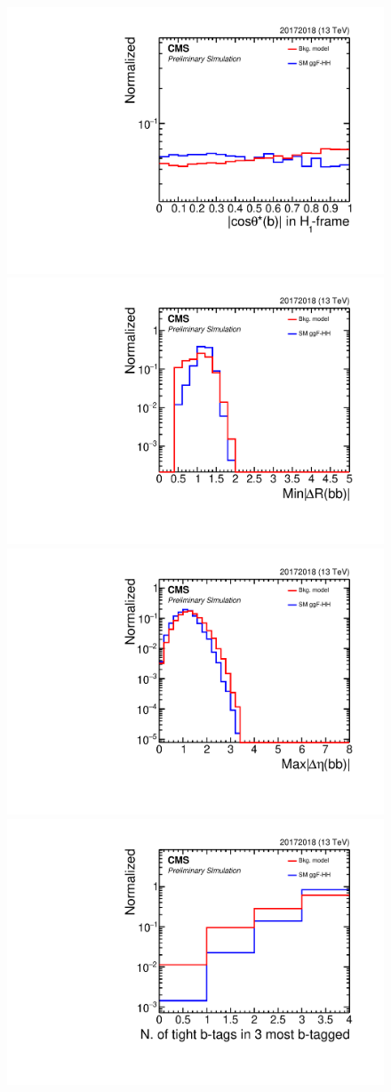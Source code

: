 \begin{figure}[ht!]
\begin{center}
\includegraphics[width=0.24\linewidth]{Figures/AnalysisStrategy/signalobservables/ggfcategories//20172018ggfmva1/plot_20172018_h_abs_costh_H1_b1_h1cm.pdf}
\includegraphics[width=0.24\linewidth]{Figures/AnalysisStrategy/signalobservables/ggfcategories//20172018ggfmva1/plot_20172018_h_min_4b_deltaR.pdf}
\includegraphics[width=0.24\linewidth]{Figures/AnalysisStrategy/signalobservables/ggfcategories//20172018ggfmva1/plot_20172018_h_max_4b_deltaEta.pdf}
\includegraphics[width=0.24\linewidth]{Figures/AnalysisStrategy/signalobservables/ggfcategories//20172018ggfmva1/plot_20172018_h_nBtagTight.pdf}
\end{center}
\end{figure}

\clearpage

